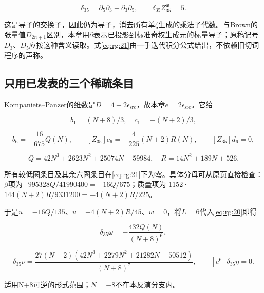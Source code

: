 \documentclass[11pt,a4paper,oneside]{ctexrep}
\theoremstyle{cnplain}
\theoremstyle{definition}
\theoremstyle{remark}
\begin{document}
\begin{equation}
\delta_{35}=\partial_5\partial_3-\partial_3\partial_5,
 \qquad \delta_{35} Z_{35}^{\mathfrak m}=5.         \label{eq:rg:21}
\end{equation}

这是导子的交换子，因此仍为导子，消去所有单\(\zeta\)生成的乘法子代数。与Brown的张量值\(D_{2n+1}\)区别，本章用\(\partial\)表示已投影到标准奇权生成元的标量导子；原稿记号\(D_3\)、\(D_5\)应按这种含义读取。式\eqref{eq:rg:21}由一手迭代积分公式给出，不依赖旧切词程序的声称。

\subsection{只用已发表的三个稀疏条目}\label{sec:rg:7.2}

Kompaniets--Panzer\cite[eqs.(16),(18),(19)]{kp}的维数是\(D=4-2 \epsilon _{\mathrm{src}}\)，故本章\(e=2 \epsilon _{\mathrm{src}}\)。它给

\begin{equation}
b_1=(N+8)/3,\quad c_1=-(N+2)/3,
\end{equation}

\begin{equation}
[Z_{35}]b_6=-\frac{16}{675}Q(N),\qquad
 [Z_{35}]c_6=-\frac4{225}(N+2)R(N),\qquad
 [Z_{35}]d_6=0,
\end{equation}

\begin{equation}
Q=42N^3+2623N^2+25074N+59984,\quad
 R=14N^2+189N+526.                                 \label{eq:rg:22}
\end{equation}

所有较低圈条目及其余六圈条目在\eqref{eq:rg:21}下为零。具体分母可从原页直接检查：\(\beta\)项为\(-995328 Q/41990400=-16Q/675\)；质量项为-1152·\(144(N+2)R/9331200=-4(N+2)R/225\)。

于是\(u=-16Q/135\)、\(v=-4(N+2)R/45\)、\(w=0\)，将\(L=6\)代入\eqref{eq:rg:20}即得

\begin{equation}
[e^6]\delta_{35}\omega=-\frac{432Q(N)}{(N+8)^6},
\end{equation}

\begin{equation}
[e^6]\delta_{35}\nu=
 \frac{27(N+2)(42N^3+2279N^2+21282N+50512)}{(N+8)^7},
 \qquad [e^6]\delta_{35}\eta=0.                    \label{eq:rg:23}
\end{equation}

适用N+8可逆的形式范围；\(N=-8\)不在本反演分支内。
\end{document}
